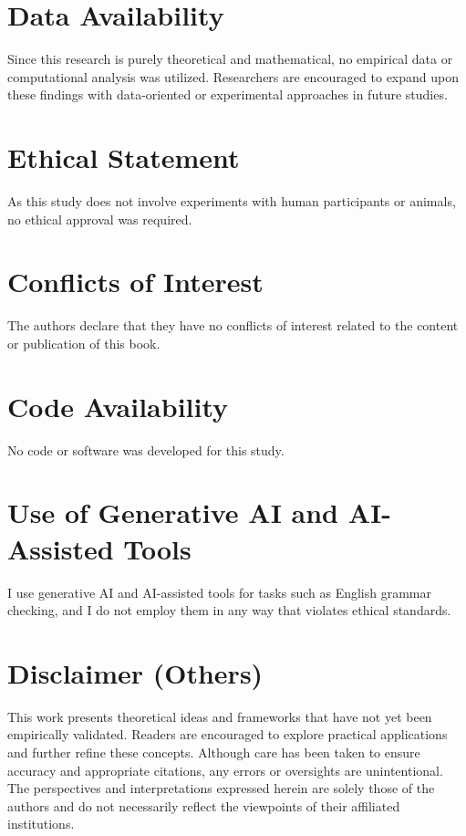 \documentclass[10pt]{book}
\theoremstyle{definition}
\begin{document}
\section*{Data Availability}
Since this research is purely theoretical and mathematical, no empirical data or computational analysis was utilized. Researchers are encouraged to expand upon these findings with data-oriented or experimental approaches in future studies.

\section*{Ethical Statement}
As this study does not involve experiments with human participants or animals, no ethical approval was required.

\section*{Conflicts of Interest}
The authors declare that they have no conflicts of interest related to the content or publication of this book.

\section*{Code Availability}
No code or software was developed for this study.

\section*{Use of Generative AI and AI-Assisted Tools}
I use generative AI and AI-assisted tools for tasks such as English grammar checking, and I do not employ them in any way that violates ethical standards.

\section*{Disclaimer (Others)}
This work presents theoretical ideas and frameworks that have not yet been empirically validated. Readers are encouraged to explore practical applications and further refine these concepts. Although care has been taken to ensure accuracy and appropriate citations, any errors or oversights are unintentional. The perspectives and interpretations expressed herein are solely those of the authors and do not necessarily reflect the viewpoints of their affiliated institutions.

\newpage
\end{document}
